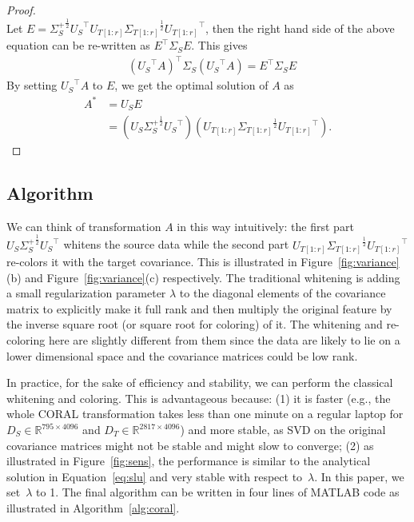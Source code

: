 \documentclass[letterpaper]{article}
\begin{document}
\begin{proof}
\begin{equation*}
\end{equation*}
Let $E ={\Sigma_S^{+}}^{\frac{1}{2}} {U_S}^{\top} {U_{T[1:r]}} {\Sigma_{T[1:r]}}^{\frac{1}{2}}{U_{T[1:r]}}^{\top}$, then the right hand side of the above equation can be re-written as ${E}^{\top}{\Sigma_S}E$. This gives
\begin{align*}
&{({U_S}^{\top}A)}^{\top}{\Sigma_S}({U_S}^{\top}{A})= {E}^{\top}{\Sigma_S}E
\end{align*}
By setting ${U_S}^{\top}A$ to $E$, we get the optimal solution of $A$ as 
\begin{equation} 
\begin{aligned}
A^{*}&={U_S}E\\
&=(U_{S}{\Sigma_S^{+}}^{\frac{1}{2}}{U_{S}}^{\top})(U_{T[1:r]}{\Sigma_{T[1:r]}}^{\frac{1}{2}}{U_{T[1:r]}}^{\top}).\end{aligned}
\label{eq:slu}
\end{equation}
\end{proof}

\subsection{Algorithm}
\label{subsec:algo}
We can think of transformation $A$ in this way intuitively: the first part $U_{S}{\Sigma_S^{+}}^{\frac{1}{2}}{U_{S}}^{\top}$ whitens the source data while the second part $U_{T[1:r]}{\Sigma_{T[1:r]}}^{\frac{1}{2}}{U_{T[1:r]}}^{\top}$ re-colors it with the target covariance. This is illustrated in Figure~\ref{fig:variance}(b) and Figure~\ref{fig:variance}(c) respectively. The traditional whitening is adding a small regularization parameter $\lambda$ to the diagonal elements of the covariance matrix to explicitly make it full rank and then multiply the original feature by the inverse square root (or square root for coloring) of it. The whitening and re-coloring here are slightly different from them since the data are likely to lie on a lower dimensional space and the covariance matrices could be low rank. 

In practice, for the sake of efficiency and stability, we can perform the classical whitening and coloring. This is advantageous because: (1) 
it is faster (e.g., the whole CORAL transformation takes less than one minute on a regular laptop for $D_S\in\mathbb{R}^{795\times4096}$ and $D_T\in\mathbb{R}^{2817\times4096}$) and more stable, as SVD on the original covariance matrices might not be stable and might slow to converge; (2) as illustrated in Figure~\ref{fig:sens}, the performance is similar to the analytical solution in Equation~\eqref{eq:slu} and very stable with respect to~$\lambda$. In this paper, we set~$\lambda$ to 1. The final algorithm can be written in four lines of MATLAB code as illustrated in Algorithm~\ref{alg:coral}.
 
\end{document}
